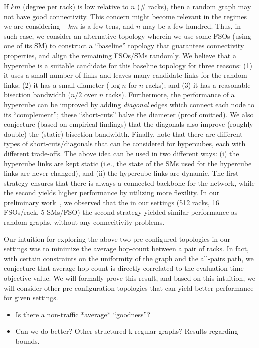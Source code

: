 If $km$ (degree per rack) is low relative to $n$ (\# racks), then a
random graph may not have good connectivity.  This concern might
become relevant in the regimes we are considering -- $km$ is a few
tens, and $n$ may be a few hundred.  Thus, in such case, we consider
an alternative topology wherein we use some FSOs (using one of its SM)
to construct a ``baseline'' topology that guarantees connectivity
properties, and align the remaining FSOs/SMs randomly.
%
We believe that a hypercube is a suitable candidate for this baseline
topology for three reasons: (1) it uses a small number of links and
leaves many candidate links for the random links; (2) it has a small
diameter ($\log n$ for $n$ racks); and (3) it has a reasonable
bisection bandwidth ($n/2$ over $n$ racks).  Furthermore, the
performance of a hypercube can be improved by adding {\em diagonal}
edges which connect each node to its ``complement''; these
``short-cuts'' halve the diameter (proof omitted). We also conjecture
(based on empirical findings) that the diagonals also improve (roughly
double) the (static) bisection bandwidth. 
%
Finally, note that there are different types of short-cuts/diagonals
that can be considered for hypercubes, each with different trade-offs.
%
The above idea can be used in two different ways: (i) the hypercube
links are kept static (i.e., the state of the SMs used for the hypercube 
links are never changed), and (ii) the hypercube links are dynamic. 
%
The first strategy ensures that there is always a connected backbone
for the network, while the second yields higher performance by
utilizing more flexility. In our preliminary work~\cite{hotnets}, we
observed that the in our settings (512 racks, 16 FSOs/rack, 5 SMs/FSO)
the second strategy yielded similar performance as random graphs,
without any connecitivity problems.

Our intuition for exploring the above two pre-configured topologies in
our settings was to minimize the average hop-count between a pair of
racks. In fact, with certain constraints on the uniformity of the
graph and the all-pairs path, we conjecture that average hop-count is
directly correlated to the evaluation time objective value. We will
formally prove this result, and based on this intuition, we will
consider other pre-configuration topologies that can yield better
performance for given settings. 

\begin{itemize}
\item
Is there a non-traffic *average* ``goodness''? 
\item
 Can we do better? Other structured k-regular graphs? Results regarding bounds.
\end{itemize}

